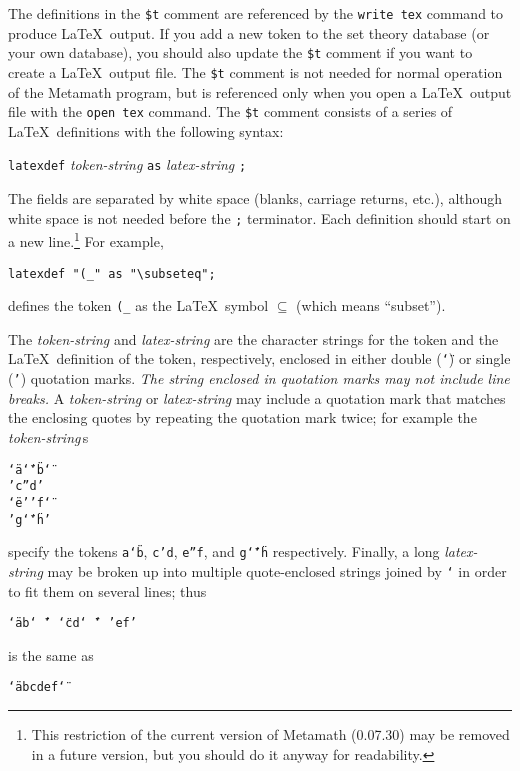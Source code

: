 The definitions in the \texttt{\$t} comment are referenced
by the \texttt{write tex} command to produce \LaTeX\ output.  If you add a new
token to the set theory database (or your own database), you should also
update the \texttt{\$t} comment if you want to create a \LaTeX\
output file.  The \texttt{\$t} comment is not needed for normal
operation of the Metamath program, but is referenced only when you open a
\LaTeX\ output file with the \texttt{open tex} command.  The
\texttt{\$t} comment consists of a series of \LaTeX\ definitions with
the following syntax:
\begin{center}
 \texttt{latexdef} {\em token-string} \texttt{as} {\em latex-string}
 \texttt{;}
\end{center}
%
The fields are separated by white space (blanks, carriage returns,
etc.), although white space is not needed before the \texttt{;}
terminator.  Each definition should start on a new line.\footnote{This
restriction of the current version of Metamath
(0.07.30) may be removed
in a future version, but you should do it anyway for readability.} For
example,
\begin{center}
 \verb$latexdef "(_" as "\subseteq";$
\end{center}
defines the token \verb$(_$ as the \LaTeX\ symbol $\subseteq$ (which means
``subset'').

The {\em token-string} and {\em latex-string} are the character strings for
the token and the \LaTeX\ definition of the token, respectively, enclosed in
either double (\texttt{\char`\"}) or single (\texttt{'}) quotation
marks.  {\em The string enclosed in quotation marks may not include
line breaks.}  A {\em token-string} or {\em latex-string}
may include a quotation mark that matches the enclosing quotes by repeating
the quotation mark twice; for example the {\em token-string}\,s
\begin{center}
 \texttt{\char`\"a\char`\"\char`\"b\char`\"}\\
 \texttt{'c''d'}\\
 \texttt{\char`\"e''f\char`\"}\\
 \texttt{'g\char`\"\char`\"h'}
\end{center}
specify the tokens \texttt{a\char`\"b}, \texttt{c'd}, \texttt{e''f}, and
\texttt{g\char`\"\char`\"h} respectively.  Finally, a long {\em
latex-string} may be broken up into multiple quote-enclosed strings
joined by \texttt{\char`\+} in order to fit them on several lines; thus
\begin{center}
 \texttt{\char`\"ab\char`\"\ \char`\+\ \char`\"cd\char`\"
    \ \char`\+\ 'ef'}
\end{center}
is the same as
\begin{center}
 \texttt{\char`\"abcdef\char`\"}
\end{center}

